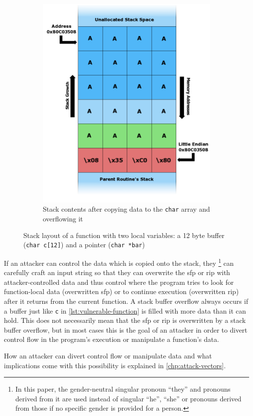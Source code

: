 \begin{figure}[htb]
\begin{subfigure}[t]{0.28\textwidth}
		\includegraphics[height=0.25\textheight]{figures/Stack_Overflow_4}
		\caption{Stack contents after copying data to the \texttt{char} array and overflowing it \cite{Lynn2007b}}
		\label{fig:stack-layout-overflow}
	\end{subfigure}
	\caption{Stack layout of a function with two local variables: a 12 byte buffer (\texttt{char c[12]}) and a pointer (\texttt{char *bar})}
	\label{fig:stack-layout}
\end{figure}

If an attacker can control the data which is copied onto the stack, they%
	\footnote{In this paper, the gender-neutral singular pronoun ``they'' and pronouns derived from it are used instead of singular ``he'', ``she'' or pronouns derived from those if no specific gender is provided for a person.}
can carefully craft an input string so that they can overwrite the \gls{sfp} or \gls{rip} with attacker-controlled data and thus control where the program tries to look for function-local data (overwritten \gls{sfp}) or to continue execution (overwritten \gls{rip}) after it returns from the current function.
A stack buffer overflow always occurs if a buffer just like \texttt{c} in \cref{lst:vulnerable-function} is filled with more data than it can hold.
This does not necessarily mean that the \gls{sfp} or \gls{rip} is overwritten by a stack buffer overflow, but in most cases this is the goal of an attacker in order to divert control flow in the program's execution or manipulate a function's data.

How an attacker can divert control flow or manipulate data and what implications come with this possibility is explained in \cref{chp:attack-vectors}.

